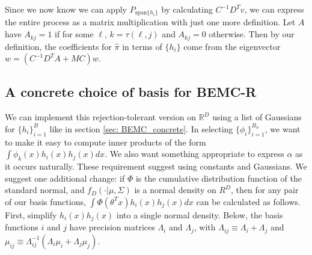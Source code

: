 \documentclass{article}
\begin{document}
Since we now know we can apply $ P_{\text{span}\{h_i\}}$ by calculating $C^{-1}D^Tv$, we can express the entire process as a matrix multiplication with just one more definition. Let $A$ have $A_{kj}=1$ if for some $\ell$, $k=\tau(\ell, j)$ and $A_{kj}=0$ otherwise. Then by our definition, the coefficients for $\hat{\pi}$ in terms of $\{h_i\}$ come from the eigenvector $w = (C^{-1}D^TA + MC)w$.

\subsection{A concrete choice of basis for BEMC-R}
\label{sec: BEMC-R_concrete}

We can implement this rejection-tolerant version on $\mathbb{R}^D$ using a list of Gaussians for $\{h_i\}_{i=1}^B$ like in section \ref{sec: BEMC_concrete}. In selecting $\{\phi_i\}_{i=1}^{B_\phi}$, we want to make it easy to compute inner products of the form $\int \phi_k(x)h_i(x)h_j(x)dx$. We also want something appropriate to express $\alpha$ as it occurs naturally. These requirement suggest using constants and Gaussians. We suggest one additional change: if $\Phi$ is the cumulative distribution function of the standard normal, and $f_D(\cdot|\mu, \Sigma)$ is a normal density on $R^D$, then for any pair of our basis functions, $\int \Phi(\theta ^T x)h_i(x)h_j(x)dx$ can be calculated as follows. First, simplify $h_i(x)h_j(x)$ into a single normal density. Below, the basis functions $i$ and $j$ have precision matrices $\Lambda_i$ and $\Lambda_j$, with $\Lambda_{ij}\equiv \Lambda_i+\Lambda_j$ and $\mu_{ij}\equiv \Lambda_{ij}^{-1}(\Lambda_i\mu_i+\Lambda_j\mu_j)$.
\end{document}
